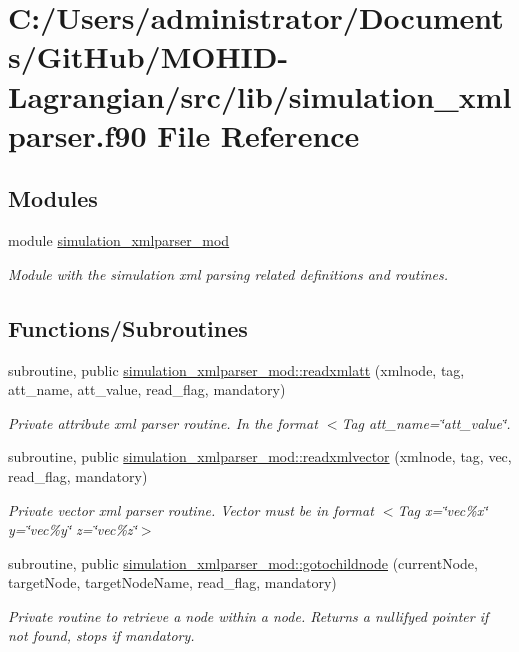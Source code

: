 \hypertarget{simulation__xmlparser_8f90}{}\section{C\+:/\+Users/administrator/\+Documents/\+Git\+Hub/\+M\+O\+H\+I\+D-\/\+Lagrangian/src/lib/simulation\+\_\+xmlparser.f90 File Reference}
\label{simulation__xmlparser_8f90}
\subsection*{Modules}
\begin{DoxyCompactItemize}
\item 
module \hyperlink{namespacesimulation__xmlparser__mod}{simulation\+\_\+xmlparser\+\_\+mod}
\begin{DoxyCompactList}\small\item\em Module with the simulation xml parsing related definitions and routines. \end{DoxyCompactList}\end{DoxyCompactItemize}
\subsection*{Functions/\+Subroutines}
\begin{DoxyCompactItemize}
\item 
subroutine, public \hyperlink{namespacesimulation__xmlparser__mod_ab062c8e064b043446d4f6ac695b306ab}{simulation\+\_\+xmlparser\+\_\+mod\+::readxmlatt} (xmlnode, tag, att\+\_\+name, att\+\_\+value, read\+\_\+flag, mandatory)
\begin{DoxyCompactList}\small\item\em Private attribute xml parser routine. In the format $<$Tag att\+\_\+name=\char`\"{}att\+\_\+value\char`\"{}. \end{DoxyCompactList}\item 
subroutine, public \hyperlink{namespacesimulation__xmlparser__mod_a48bcd153bef2149410d66842b564728d}{simulation\+\_\+xmlparser\+\_\+mod\+::readxmlvector} (xmlnode, tag, vec, read\+\_\+flag, mandatory)
\begin{DoxyCompactList}\small\item\em Private vector xml parser routine. Vector must be in format $<$\+Tag x=\char`\"{}vec\%x\char`\"{} y=\char`\"{}vec\%y\char`\"{} z=\char`\"{}vec\%z\char`\"{}$>$ \end{DoxyCompactList}\item 
subroutine, public \hyperlink{namespacesimulation__xmlparser__mod_a3167fcb99b40cdc25d2ba18418bd8b9f}{simulation\+\_\+xmlparser\+\_\+mod\+::gotochildnode} (current\+Node, target\+Node, target\+Node\+Name, read\+\_\+flag, mandatory)
\begin{DoxyCompactList}\small\item\em Private routine to retrieve a node within a node. Returns a nullifyed pointer if not found, stops if mandatory. \end{DoxyCompactList}\end{DoxyCompactItemize}
